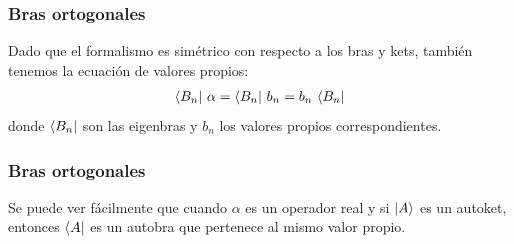 \documentclass[12pt]{beamer}
\begin{document}

\begin{frame}
\frametitle{Bras ortogonales}
Dado que el formalismo es simétrico con respecto a los bras y kets, también tenemos la ecuación de valores propios:
\begin{align*}
\bra{B_{n}} \, \alpha = \bra{B_{n}} \, b_{n} = b_{n} \, \bra{B_{n}}
\end{align*}
donde $\bra{B_{n}}$ son las eigenbras y $b_{n}$ los valores propios correspondientes.
\end{frame}
\begin{frame}
\frametitle{Bras ortogonales}
Se puede ver fácilmente que cuando $\alpha$ es un operador real y si $\ket{A}$ es un autoket, entonces $\bra{A}$ es un autobra que pertenece al mismo valor propio.%
\end{frame}
\end{document}
